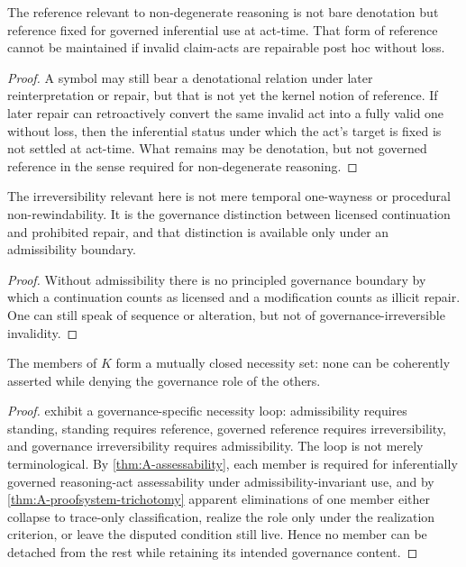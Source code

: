 \begin{proposition}
\label{prop:A-ref-requires-irr}
The reference relevant to non-degenerate reasoning is not bare denotation but reference fixed for governed inferential use at act-time. That form of reference cannot be maintained if invalid claim-acts are repairable post hoc without loss.
\end{proposition}

\begin{proof}
A symbol may still bear a denotational relation under later reinterpretation or repair, but that is not yet the kernel notion of reference. If later repair can retroactively convert the same invalid act into a fully valid one without loss, then the inferential status under which the act's target is fixed is not settled at act-time. What remains may be denotation, but not governed reference in the sense required for non-degenerate reasoning.
\end{proof}

\begin{proposition}
\label{prop:A-irr-requires-adm}
The irreversibility relevant here is not mere temporal one-wayness or procedural non-rewindability. It is the governance distinction between licensed continuation and prohibited repair, and that distinction is available only under an admissibility boundary.
\end{proposition}

\begin{proof}
Without admissibility there is no principled governance boundary by which a continuation counts as licensed and a modification counts as illicit repair. One can still speak of sequence or alteration, but not of governance-irreversible invalidity.
\end{proof}

\begin{theorem}
\label{thm:A-mutual-closure}
The members of $K$ form a mutually closed necessity set: none can be coherently asserted while denying the governance role of the others.
\end{theorem}

\begin{proof}
 exhibit a governance-specific necessity loop: admissibility requires standing, standing requires reference, governed reference requires irreversibility, and governance irreversibility requires admissibility. The loop is not merely terminological. By \cref{thm:A-assessability}, each member is required for inferentially governed reasoning-act assessability under admissibility-invariant use, and by \cref{thm:A-proofsystem-trichotomy} apparent eliminations of one member either collapse to trace-only classification, realize the role only under the realization criterion, or leave the disputed condition still live. Hence no member can be detached from the rest while retaining its intended governance content.
\end{proof}

